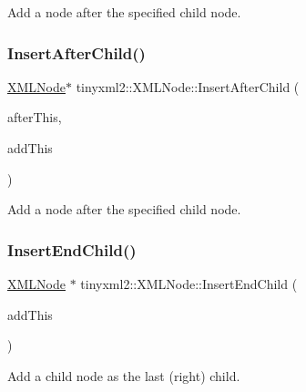 Add a node after the specified child node. \mbox{\label{classtinyxml2_1_1XMLNode_a85adb8f0b7477eec30f9a41d420b09c2}} 
\subsubsection{\texorpdfstring{Insert\+After\+Child()}{InsertAfterChild()}\hspace{0.1cm}{\footnotesize\ttfamily [2/2]}}
{\footnotesize\ttfamily \hyperlink{classtinyxml2_1_1XMLNode}{X\+M\+L\+Node}$\ast$ tinyxml2\+::\+X\+M\+L\+Node\+::\+Insert\+After\+Child (\begin{DoxyParamCaption}\item[{\hyperlink{classtinyxml2_1_1XMLNode}{X\+M\+L\+Node} $\ast$}]{after\+This,  }\item[{\hyperlink{classtinyxml2_1_1XMLNode}{X\+M\+L\+Node} $\ast$}]{add\+This }\end{DoxyParamCaption})}

Add a node after the specified child node. \mbox{\label{classtinyxml2_1_1XMLNode_ae3b422e98914d6002ca99bb1d2837103}} 
\subsubsection{\texorpdfstring{Insert\+End\+Child()}{InsertEndChild()}\hspace{0.1cm}{\footnotesize\ttfamily [1/2]}}
{\footnotesize\ttfamily \hyperlink{classtinyxml2_1_1XMLNode}{X\+M\+L\+Node} $\ast$ tinyxml2\+::\+X\+M\+L\+Node\+::\+Insert\+End\+Child (\begin{DoxyParamCaption}\item[{\hyperlink{classtinyxml2_1_1XMLNode}{X\+M\+L\+Node} $\ast$}]{add\+This }\end{DoxyParamCaption})}

Add a child node as the last (right) child. \mbox{\label{classtinyxml2_1_1XMLNode_aeb249ed60f4e8bfad3709151c3ee4286}} 
